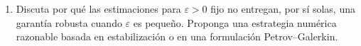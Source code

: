 \documentclass[11pt]{article}
\begin{document}
\begin{enumerate}[label=\textbf{\arabic*.}, leftmargin=*]
\begin{enumerate}[label=(\alph*), leftmargin=*]
    \item Discuta por qu\'e las estimaciones para $\varepsilon>0$ fijo no entregan, por s\'i solas, una garant\'ia robusta cuando $\varepsilon$ es peque\~no. Proponga una estrategia num\'erica razonable basada en estabilizaci\'on o en una formulaci\'on Petrov--Galerkin.
\end{enumerate}

\end{enumerate}
\end{document}
